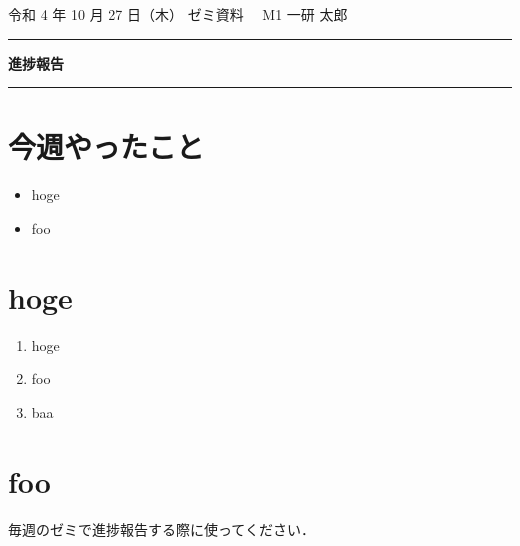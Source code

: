 \documentclass[onecolumn]{jarticle}
\begin{document}


\noindent

\hspace{1em}

令和 4 年 10 月 27 日（木） ゼミ資料
\hfill
\ \ M1 一研 太郎

\vspace{2mm}
\hrule

\begin{center}
{\Large \bf 進捗報告}
\end{center}


\hrule
\vspace{3mm}

\section{今週やったこと}
\begin{itemize}
\item hoge \vspace{-0.5em}
\item foo
\end{itemize}


\section{hoge}
\begin{enumerate}
\item hoge \vspace{-0.5em}
\item foo \vspace{-0.5em}
\item baa
\end{enumerate}	

\section{foo}
毎週のゼミで進捗報告する際に使ってください．
\end{document}
